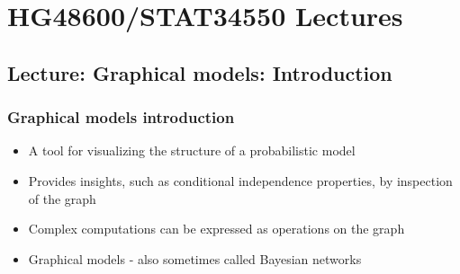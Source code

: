 \documentclass[10pt,containsverbatim,paralist]{article}
\date{\today}
\title{}
\begin{document}
\section{HG48600/STAT34550 Lectures}
\label{sec-1}
\subsection{Lecture: Graphical models: Introduction}
\label{sec-1-1}
\subsubsection*{Graphical models introduction}
\label{sec-1-1-1}
\begin{itemize}
\item A tool for visualizing the structure of a probabilistic model
\item Provides insights, such as conditional independence properties, by inspection of the graph
\item Complex computations can be expressed as operations on the graph
\item Graphical models - also sometimes called Bayesian networks
\end{itemize}
\end{document}
